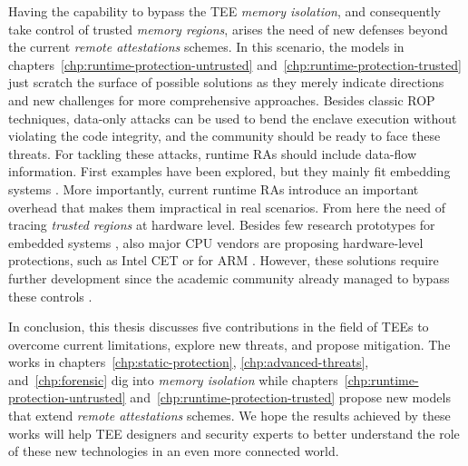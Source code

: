 Having the capability to bypass the TEE \emph{memory isolation}, and 
consequently take control of trusted  \emph{memory regions}, arises the need 
of new defenses beyond the current \emph{remote attestations} schemes.
In this scenario, the models in chapters~\ref{chp:runtime-protection-untrusted} 
and~\ref{chp:runtime-protection-trusted} just scratch the surface of 
possible solutions as they merely indicate directions and new challenges for 
more comprehensive approaches.
Besides classic ROP techniques, data-only attacks can be used to bend the 
enclave execution without violating the code integrity, and the community 
should be ready to face these threats.
For tackling these attacks, runtime RAs should include data-flow information.
First examples have been explored, but they mainly fit embedding systems 
\citep{sun2020oat,aberadiat}.
More importantly, current runtime RAs introduce an important overhead 
that makes them impractical in real scenarios.
From here the need of tracing \emph{trusted regions} at hardware level.
Besides few research prototypes for embedded systems 
\citep{Dessouky:2018:LLH:3240765.3240821}, also major CPU vendors are proposing 
hardware-level protections, such as Intel CET \citep{intelcet} or for ARM 
\citep{armpa}.
However, these solutions require further development since the academic 
community already managed to bypass these controls \citep{van2012memory}.

In conclusion, this thesis discusses five contributions in the field of TEEs to 
overcome current limitations, explore new threats, and propose mitigation.
The works in chapters~\ref{chp:static-protection}, \ref{chp:advanced-threats}, 
and~\ref{chp:forensic} dig into \emph{memory isolation} while 
chapters~\ref{chp:runtime-protection-untrusted} 
and~\ref{chp:runtime-protection-trusted} propose new models that extend 
\emph{remote attestations} schemes.
We hope the results achieved by these works will help TEE designers and 
security experts to better understand the role of these new technologies in 
an even more connected world.


